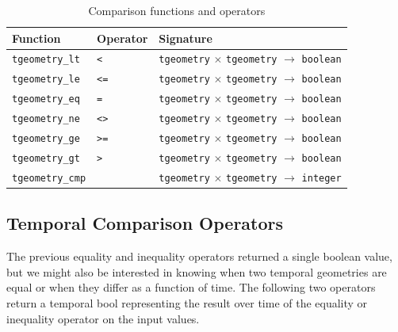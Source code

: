 \begin{table}[h!]
    \centering
    \begin{tabularx}{\textwidth}{|l|l|X|}
    \hline
    \textbf{Function}   & \textbf{Operator} & \textbf{Signature} \\
    \hline
    \lstinline+tgeometry_lt+    & \lstinline+<+    & \lstinline+tgeometry+ $\times$ \lstinline+tgeometry+ $\rightarrow$ \lstinline+boolean+ \\
    \hline
    \lstinline+tgeometry_le+    & \lstinline+<=+   & \lstinline+tgeometry+ $\times$ \lstinline+tgeometry+ $\rightarrow$ \lstinline+boolean+ \\
    \hline
    \lstinline+tgeometry_eq+    & \lstinline+=+    & \lstinline+tgeometry+ $\times$ \lstinline+tgeometry+ $\rightarrow$ \lstinline+boolean+ \\
    \hline
    \lstinline+tgeometry_ne+    & \lstinline+<>+   & \lstinline+tgeometry+ $\times$ \lstinline+tgeometry+ $\rightarrow$ \lstinline+boolean+ \\
    \hline
    \lstinline+tgeometry_ge+    & \lstinline+>=+   & \lstinline+tgeometry+ $\times$ \lstinline+tgeometry+ $\rightarrow$ \lstinline+boolean+ \\
    \hline
    \lstinline+tgeometry_gt+    & \lstinline+>+    & \lstinline+tgeometry+ $\times$ \lstinline+tgeometry+ $\rightarrow$ \lstinline+boolean+ \\
    \hline
    \lstinline+tgeometry_cmp+   &                  & \lstinline+tgeometry+ $\times$ \lstinline+tgeometry+ $\rightarrow$ \lstinline+integer+ \\
    \hline
    \end{tabularx}
    \caption{Comparison functions and operators}
    \label{table:comparison_funcs}
\end{table}

\subsection{Temporal Comparison Operators}
\label{section:temporal_comparison}

The previous equality and inequality operators returned a single boolean value, but we might also be interested in knowing when two temporal geometries are equal or when they differ as a function of time. The following two operators return a temporal bool representing the result over time of the equality or inequality operator on the input values.

